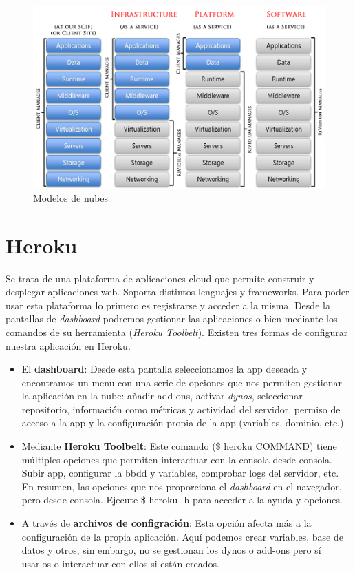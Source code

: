\begin{figure}[H]
	\centering
	\includegraphics[width=12cm]{./images/cloud-models.png}
	\caption{Modelos de nubes} \label{fig:cloud-models}
\end{figure}

\vspace*{0.2in}
\section{Heroku}\label{cap.3.2}

Se trata de una plataforma de aplicaciones cloud que permite construir y desplegar aplicaciones web. Soporta distintos lenguajes y frameworks. Para poder usar esta plataforma lo primero es registrarse y acceder a la misma. Desde la pantallas de \emph{dashboard} podremos gestionar las aplicaciones o bien mediante los comandos de su herramienta (\href{https://devcenter.heroku.com/start}{\emph{Heroku Toolbelt}}). Existen tres formas de configurar nuestra aplicación en Heroku.
\begin{itemize}
	\item El \textbf{dashboard}: Desde esta pantalla seleccionamos la app deseada y encontramos un menu con una serie de opciones que nos permiten gestionar la aplicación en la nube: añadir add-ons, activar \emph{dynos}, seleccionar repositorio, información como métricas y actividad del servidor, permiso de acceso a la app y la configuración propia de la app (variables, dominio, etc.).
	\item Mediante \textbf{Heroku Toolbelt}: Este comando (\$ heroku COMMAND) tiene múltiples opciones que permiten interactuar con la consola desde consola. Subir app, configurar la bbdd y variables, comprobar logs del servidor, etc. En resumen, las opciones que nos proporciona el \emph{dashboard} en el navegador, pero desde consola. Ejecute \$ heroku -h para acceder a la ayuda y opciones.
	\item A través de \textbf{archivos de configración}: Esta opción afecta más a la configuración de la propia aplicación. Aquí podemos crear variables, base de datos y otros, sin embargo, no se gestionan los dynos o add-ons pero sí usarlos o interactuar con ellos si están creados.
\end{itemize}

